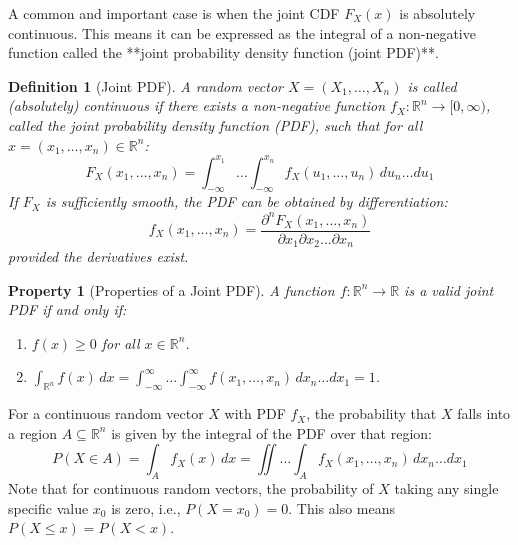 \documentclass[11pt, a4paper]{article}
\newtheorem{definition}[theorem]{Definition}
\newtheorem{property}[theorem]{Property}
\theoremstyle{definition} %
\newcommand{\R}{\mathbb{R}}
\begin{document}
A common and important case is when the joint CDF $F_X(x)$ is absolutely continuous. This means it can be expressed as the integral of a non-negative function called the **joint probability density function (joint PDF)**.

\begin{definition}[Joint PDF]
A random vector $X = (X_1, \dots, X_n)$ is called (absolutely) continuous if there exists a non-negative function $f_X: \R^n \to [0, \infty)$, called the joint probability density function (PDF), such that for all $x = (x_1, \dots, x_n) \in \R^n$:
\[ F_X(x_1, \dots, x_n) = \int_{-\infty}^{x_1} \dots \int_{-\infty}^{x_n} f_X(u_1, \dots, u_n) \, du_n \dots du_1 \]
If $F_X$ is sufficiently smooth, the PDF can be obtained by differentiation:
\begin{equation} \label{eq:pdf_from_cdf}
f_X(x_1, \dots, x_n) = \frac{\partial^n F_X(x_1, \dots, x_n)}{\partial x_1 \partial x_2 \dots \partial x_n}
\end{equation}
provided the derivatives exist.
\end{definition}

\begin{property}[Properties of a Joint PDF]
A function $f: \R^n \to \R$ is a valid joint PDF if and only if:
\begin{enumerate}
    \item $f(x) \ge 0$ for all $x \in \R^n$.
    \item $\int_{\R^n} f(x) \, dx = \int_{-\infty}^{\infty} \dots \int_{-\infty}^{\infty} f(x_1, \dots, x_n) \, dx_n \dots dx_1 = 1$.
\end{enumerate}
\end{property}

For a continuous random vector $X$ with PDF $f_X$, the probability that $X$ falls into a region $A \subseteq \R^n$ is given by the integral of the PDF over that region:
\[ P(X \in A) = \int_{A} f_X(x) \, dx = \iint \dots \int_{A} f_X(x_1, \dots, x_n) \, dx_n \dots dx_1 \]
Note that for continuous random vectors, the probability of $X$ taking any single specific value $x_0$ is zero, i.e., $P(X = x_0) = 0$. This also means $P(X \le x) = P(X < x)$.
\end{document}
